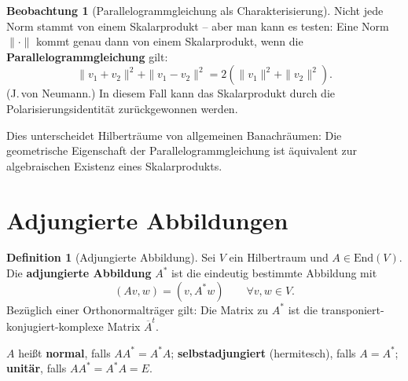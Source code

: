 ﻿\documentclass[a4paper,12pt]{report}
\theoremstyle{definition}
\newtheorem{definition}{Definition}
\newtheorem{beobachtung}{Beobachtung}
\begin{document}
\begin{beobachtung}[Parallelogrammgleichung als Charakterisierung]
    Nicht jede Norm stammt von einem Skalarprodukt -- aber man kann es
    testen: Eine Norm $\|\cdot\|$ kommt genau dann von einem Skalarprodukt,
    wenn die \textbf{Parallelogrammgleichung} gilt:
    \[
        \|v_1 + v_2\|^2 + \|v_1 - v_2\|^2 = 2(\|v_1\|^2 + \|v_2\|^2).
    \]
    (J.\,von Neumann.) In diesem Fall kann das Skalarprodukt durch die
    Polarisierungsidentität zurückgewonnen werden.

    Dies unterscheidet Hilberträume von allgemeinen Banachräumen:
    Die geometrische Eigenschaft der Parallelogrammgleichung ist äquivalent
    zur algebraischen Existenz eines Skalarprodukts.
\end{beobachtung}

\section{Adjungierte Abbildungen}

\begin{definition}[Adjungierte Abbildung]
    Sei $V$ ein Hilbertraum und $A \in \mathrm{End}(V)$. Die
    \textbf{adjungierte Abbildung} $A^*$ ist die eindeutig bestimmte
    Abbildung mit
    \[
        (Av, w) = (v, A^*w) \qquad \forall v, w \in V.
    \]
    Bezüglich einer Orthonormalträger gilt: Die Matrix zu $A^*$ ist die
    transponiert-konjugiert-komplexe Matrix $\overline{A}^t$.

    $A$ heißt \textbf{normal}, falls $AA^* = A^*A$;
    \textbf{selbstadjungiert} (hermitesch), falls $A = A^*$;
    \textbf{unitär}, falls $AA^* = A^*A = E$.
\end{definition}
\end{document}
